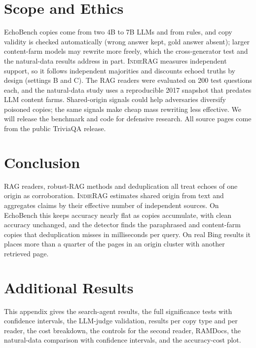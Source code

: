 \documentclass[sigconf,review,anonymous]{acmart}
\newcommand{\sys}{\textsc{IndieRAG}}
\begin{document}
\section{Scope and Ethics}\label{sec:limits}
EchoBench copies come from two 4B to 7B LLMs and from rules, and copy validity is checked automatically (wrong answer
kept, gold answer absent); larger content-farm models may rewrite more freely, which the cross-generator test and the
natural-data results address in part. \sys{} measures independent support, so it follows independent majorities and
discounts echoed truths by design (settings B and C). The RAG readers were evaluated on 200 test questions each, and
the natural-data study uses a reproducible 2017 snapshot that predates LLM content farms. Shared-origin signals could
help adversaries diversify poisoned copies; the same signals make cheap mass rewriting less effective. We will
release the benchmark and code for defensive research. All source pages come from the public TriviaQA release.

\section{Conclusion}
RAG readers, robust-RAG methods and deduplication all treat echoes of one origin as corroboration. \sys{} estimates
shared origin from text and aggregates claims by their effective number of independent sources. On EchoBench this keeps
accuracy nearly flat as copies accumulate, with clean accuracy unchanged, and the detector finds the paraphrased and
content-farm copies that deduplication misses in milliseconds per query. On real Bing results it places more than a
quarter of the pages in an origin cluster with another retrieved page.




\appendix
\section{Additional Results}\label{app:tables}
This appendix gives the search-agent results, the full significance tests with confidence intervals, the LLM-judge
validation, results per copy type and per reader, the cost breakdown, the controls for the second reader, RAMDocs, the
natural-data comparison with confidence intervals, and the accuracy-cost plot.
\end{document}
